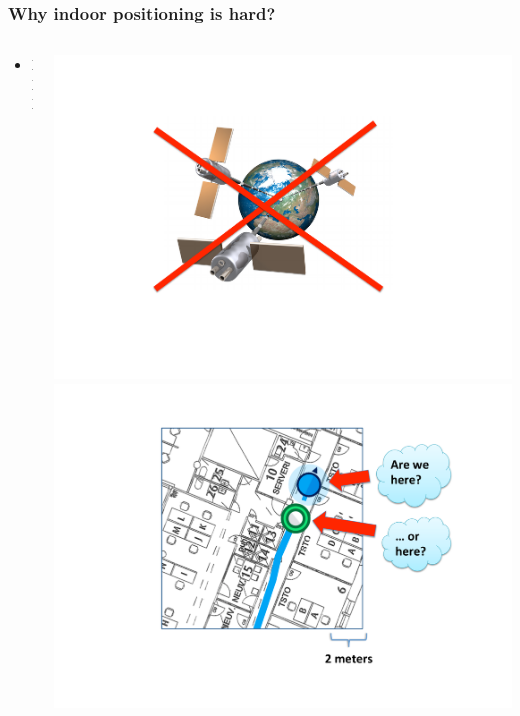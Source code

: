 \documentclass[xcolor=svgnames,english,handout]{beamer}
\begin{document}
\begin{frame}
  \frametitle{Why indoor positioning is hard?}

  \begin{columns}
  \begin{column}{0.7\textwidth}
  \begin{itemize}[<+->]       
  \item XXX
  \end{itemize}
  \end{column}
  \begin{column}{0.3\textwidth}
  \includegraphics[width=\columnwidth]{nogps} \\
  \includegraphics[width=\columnwidth]{accuracy} \\

\end{column}
\end{columns}
\end{frame}
\end{document}
